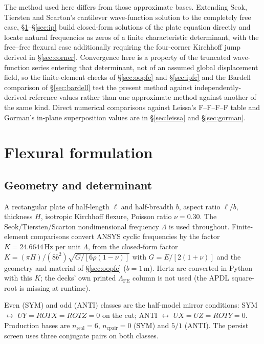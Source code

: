 \documentclass[11pt]{article}
\begin{document}
The method used here differs from those approximate bases. Extending Seok, Tiersten
and Scarton's cantilever wave-function solution \cite{seok3,seok4} to the
completely free case, \S\ref{sec:flexure}--\S\ref{sec:ip} build
closed-form solutions of the plate equation directly and locate natural
frequencies as zeros of a finite characteristic determinant, with the
free--free flexural case additionally requiring the four-corner
Kirchhoff jump derived in \S\ref{sec:corner}. Convergence here is a
property of the truncated wave-function series entering that
determinant, not of an assumed global displacement field, so the
finite-element checks of \S\ref{sec:oopfe} and \S\ref{sec:ipfe} and the
Bardell comparison of \S\ref{sec:bardell} test the present method against
independently-derived reference values rather than one approximate
method against another of the same kind. Direct numerical comparisons
against Leissa's F--F--F--F table and Gorman's in-plane superposition
values are in \S\ref{sec:leissa} and \S\ref{sec:gorman}.

\section{Flexural formulation}\label{sec:flexure}

\subsection{Geometry and determinant}\label{sec:geom}
A rectangular plate of half-length $\ell$ and half-breadth $b$, aspect
ratio $\ell/b$, thickness $H$, isotropic Kirchhoff flexure, Poisson ratio
$\nu=0.30$. The Seok/Tiersten/Scarton nondimensional frequency $\Lambda$
is used throughout. Finite-element comparisons convert ANSYS
\cite{ansys} cyclic frequencies by the factor
$K=24.6644\,\mathrm{Hz}$ per unit $\Lambda$, from the closed-form
factor
$K=(\pi H)/(8b^{2})\sqrt{G/[6\rho(1-\nu)]}$
with $G=E/[2(1+\nu)]$ and the geometry and material of
\S\ref{sec:oopfe} ($b=1\,\mathrm{m}$). Hertz are converted in Python
with this $K$; the decks' own printed $\Lambda_{\mathrm{FE}}$ column is
not used (the APDL square-root is missing at runtime).

Even (SYM) and odd (ANTI) classes are the half-model mirror conditions:
SYM $\leftrightarrow$ $UY=ROTX=ROTZ=0$ on the cut; ANTI $\leftrightarrow$
$UX=UZ=ROTY=0$. Production bases are $n_{\mathrm{real}}=6$,
$n_{\mathrm{cpair}}=0$ (SYM) and $5/1$ (ANTI). The persist screen uses
three conjugate pairs on both classes.
\end{document}
